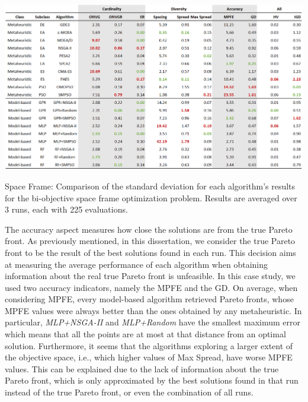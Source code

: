 \begin{table}[htbp]
	\centering
	\includegraphics[width=\textwidth]{Images/Evaluation/caadria/Results_Std_20190413.PNG}
	\caption[Space Frame: Standard deviation values of the algorithms' results]{Space Frame: Comparison of the standard deviation for each algorithm's results for the bi-objective space frame optimization problem. Results are averaged over 3 runs, each with 225 evaluations.}
	\label{table:spaceframestd}
\end{table}

The accuracy aspect measures how close the solutions are from the true Pareto front. As previously mentioned, in this dissertation, we consider the true Pareto front to be the result of the best solutions found in each run. This decision aims at measuring the average performance of each algorithm when obtaining information about the real true Pareto front is unfeasible. In this case study, we used two accuracy indicators, namely the \ac{MPFE} and the \ac{GD}. On average, when considering \ac{MPFE}, every model-based algorithm retrieved Pareto fronts, whose \ac{MPFE} values were always better than the ones obtained by any metaheuristic. In particular, \textit{MLP+NSGA-II} and \textit{MLP+Random} have the smallest maximum error which means that all the points are at most at that distance from an optimal solution. Furthermore, it seems that the algorithms exploring a larger extent of the objective space, i.e., which higher values of Max Spread, have worse \ac{MPFE} values. This can be explained due to the lack of information about the true Pareto front, which is only approximated by the best solutions found in that run instead of the true Pareto front, or even the combination of all runs. 

